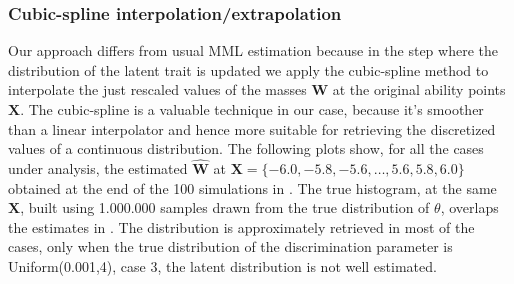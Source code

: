 \subsubsection{Cubic-spline interpolation/extrapolation}
Our approach differs from usual MML estimation because in the step where the distribution of the latent trait is updated we apply the cubic-spline method to interpolate the just rescaled values of the masses $\mathbf{W}$ at the original ability points $\mathbf{X}$. The cubic-spline is a valuable technique in our case, because it's smoother than a linear interpolator and hence more suitable for retrieving the discretized values of a continuous distribution. 
The following plots show, for all the cases under analysis, the estimated $\mathbf{\hat{W}}$ at $\mathbf{X}=\{-6.0,-5.8,-5.6,\ldots,5.6,5.8,6.0\}$ obtained at the end of the 100 simulations in \color{DarkCyan}{dark cyan color}\color{black}. The true histogram, at the same $\mathbf{X}$, built using 1.000.000 samples drawn from the true distribution of $\theta$, overlaps the estimates in \color{Indigo}{indigo color}\color{black}.
The distribution is approximately retrieved in most of the cases, only when the true distribution of the discrimination parameter is Uniform(0.001,4), case 3, the latent distribution is not well estimated. 

\captionsetup[subfigure]{labelformat=empty}


